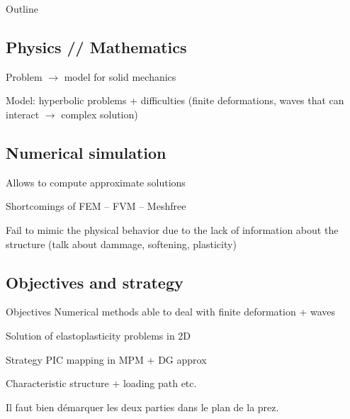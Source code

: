 \begin{frame}[plain]{Outline}
\end{frame}

\subsection{Physics // Mathematics}
\begin{frame}
  Problem $\rightarrow$ model for solid mechanics

      
  Model: hyperbolic problems + difficulties (finite deformations, waves that can interact $\rightarrow$ complex solution)
\end{frame}
\subsection{Numerical simulation}
\begin{frame}
  Allows to compute approximate solutions

  Shortcomings of FEM -- FVM -- Meshfree

  Fail to mimic the physical behavior due to the lack of information about the structure (talk about dammage, softening, plasticity)
\end{frame}

\subsection{Objectives and strategy}
\begin{frame}{Objectives}
  Numerical methods able to deal with finite deformation + waves

  Solution of elastoplasticity problems in 2D
\end{frame}

\begin{frame}{Strategy}
  PIC mapping in MPM + DG approx

  Characteristic structure + loading path etc.

  Il faut bien démarquer les deux parties dans le plan de la prez.
\end{frame}


